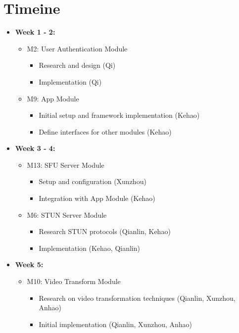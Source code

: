 \documentclass[12pt, titlepage]{article}
\begin{document}
\section{Timeine}

\begin{itemize}
  \item \textbf{Week 1 - 2:}
  \begin{itemize}
      \item M2: User Authentication Module
      \begin{itemize}
          \item Research and design (Qi)
          \item Implementation (Qi)
      \end{itemize}
      \item M9: App Module
      \begin{itemize}
          \item Initial setup and framework implementation (Kehao)
          \item Define interfaces for other modules (Kehao)
      \end{itemize}
  \end{itemize}
  \item \textbf{Week 3 - 4:}
  \begin{itemize}
      \item M13: SFU Server Module
      \begin{itemize}
          \item Setup and configuration (Xunzhou)
          \item Integration with App Module (Kehao)
      \end{itemize}
      \item M6: STUN Server Module
      \begin{itemize}
          \item Research STUN protocols (Qianlin, Kehao)
          \item Implementation (Kehao, Qianlin)
      \end{itemize}
  \end{itemize}
  \item \textbf{Week 5:}
  \begin{itemize}
      \item M10: Video Transform Module
      \begin{itemize}
          \item Research on video transformation techniques (Qianlin, Xunzhou, Anhao)
          \item Initial implementation (Qianlin, Xunzhou, Anhao)

\end{itemize}
\end{itemize}
\end{itemize}
\end{document}

